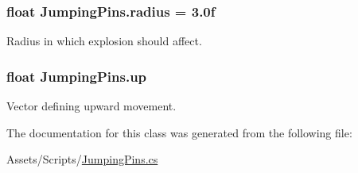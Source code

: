 \subsubsection[{radius}]{\setlength{\rightskip}{0pt plus 5cm}float Jumping\+Pins.\+radius = 3.\+0f}\label{class_jumping_pins_ae0c8d6f8c73c3efbdaf4e6fbf9a9299d}


Radius in which explosion should affect. 

\hypertarget{class_jumping_pins_a16bacff923dbd14b883bb6ec3262b78e}{}
\subsubsection[{up}]{\setlength{\rightskip}{0pt plus 5cm}float Jumping\+Pins.\+up}\label{class_jumping_pins_a16bacff923dbd14b883bb6ec3262b78e}


Vector defining upward movement. 



The documentation for this class was generated from the following file\+:\begin{DoxyCompactItemize}
\item 
Assets/\+Scripts/\hyperlink{_jumping_pins_8cs}{Jumping\+Pins.\+cs}\end{DoxyCompactItemize}
